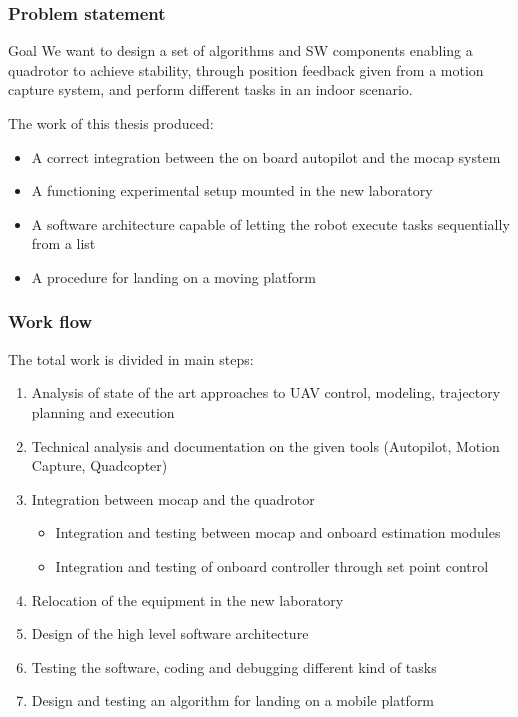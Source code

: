 \documentclass[xcolor=dvipsnames]{beamer}
\begin{document}

\begin{frame}
\frametitle{Problem statement}
\begin{block}{Goal}
We want to design a set of algorithms and SW components enabling a quadrotor
to achieve stability, through position feedback given from a motion capture system,
and perform different tasks in an indoor scenario.
\end{block} 
The work of this thesis produced:
\begin{itemize}
\item A correct integration between the on board autopilot and the mocap system
\item A functioning experimental setup mounted in the new laboratory
\item A software architecture capable of letting the robot execute tasks sequentially from a list
\item A procedure for landing on a moving platform
\end{itemize}
\end{frame}

\begin{frame}
\frametitle{Work flow}

The total work is divided in main steps:
\begin{enumerate}

\item Analysis of state of the art approaches to UAV control, modeling, trajectory planning and execution

\item Technical analysis and documentation on the given tools (Autopilot, Motion Capture, Quadcopter)

\item Integration between mocap and the quadrotor
\begin{itemize}

\item Integration and testing between mocap and onboard estimation modules
\item Integration and testing of onboard controller through set point control

\end{itemize}
\item Relocation of the equipment in the new laboratory
\item Design of the high level software architecture 
\item Testing the software, coding and debugging different kind of tasks
\item Design and testing an algorithm for landing on a mobile platform

\end{enumerate}
\end{frame}
\end{document}
